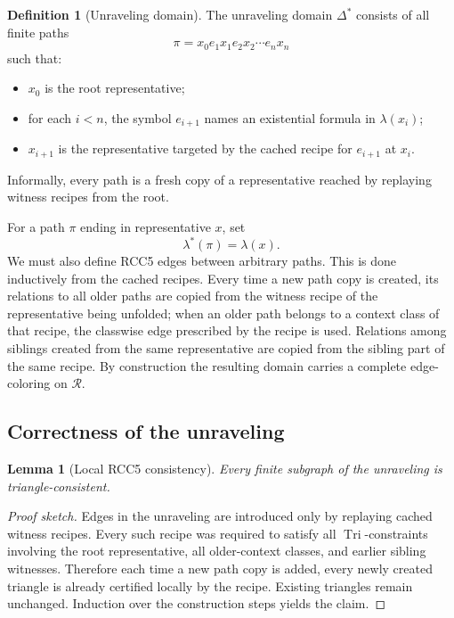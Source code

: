 \documentclass[11pt]{article}
\newtheorem{lemma}[theorem]{Lemma}
\theoremstyle{definition}
\newtheorem{definition}[theorem]{Definition}
\newcommand{\Roles}{\mathcal{R}}
\newcommand{\Tri}{\operatorname{Tri}}
\begin{document}
\begin{definition}[Unraveling domain]
The unraveling domain $\Delta^\ast$ consists of all finite paths
\[
\pi = x_0 e_1 x_1 e_2 x_2 \cdots e_n x_n
\]
such that:
\begin{itemize}
  \item $x_0$ is the root representative;
  \item for each $i<n$, the symbol $e_{i+1}$ names an existential formula in $\lambda(x_i)$;
  \item $x_{i+1}$ is the representative targeted by the cached recipe for $e_{i+1}$ at $x_i$.
\end{itemize}
Informally, every path is a fresh copy of a representative reached by replaying witness recipes from the root.
\end{definition}

For a path $\pi$ ending in representative $x$, set
\[
\lambda^\ast(\pi)=\lambda(x).
\]
We must also define RCC5 edges between arbitrary paths. This is done inductively from the cached recipes. Every time a new path copy is created, its relations to all older paths are copied from the witness recipe of the representative being unfolded; when an older path belongs to a context class of that recipe, the classwise edge prescribed by the recipe is used. Relations among siblings created from the same representative are copied from the sibling part of the same recipe. By construction the resulting domain carries a complete edge-coloring on $\Roles$.

\subsection{Correctness of the unraveling}

\begin{lemma}[Local RCC5 consistency]\label{lem:localrcc}
Every finite subgraph of the unraveling is triangle-consistent.
\end{lemma}

\begin{proof}[Proof sketch]
Edges in the unraveling are introduced only by replaying cached witness recipes. Every such recipe was required to satisfy all $\Tri$-constraints involving the root representative, all older-context classes, and earlier sibling witnesses. Therefore each time a new path copy is added, every newly created triangle is already certified locally by the recipe. Existing triangles remain unchanged. Induction over the construction steps yields the claim.
\end{proof}
\end{document}
